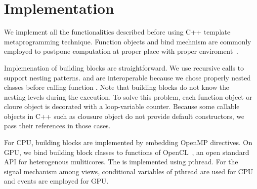 \section{Implementation}
\label{sec:details}

We implement all the functionalities described before using C++
template metaprogramming technique.
Function objects and bind mechnism are commonly employed to postpone computation
at proper place with proper enviroment~\cite{moderncpp}.

Implemenation of building blocks are straightforward. We use recursive calls
to support nesting patterns.  and  are interoperable
because we chose properly nested classes before calling function . Note that
building blocks do not know the nesting levels during the execution. To solve this
problem, each function object or cloure object is decorated with a loop-variable
counter.
Because some callable objects in C++ such as clousure object
do not provide default constructors, we pass their
references in those cases. 

For CPU, building blocks are implemented by embedding OpenMP directives. On GPU, we bind
building block classes to functions of OpenCL~\cite{opencl}, an open standard API
for heterogenous muliticores. The  is implemented using pthread.
For the signal mechanism among views, conditional variables of pthread are used
for CPU and events are employed for GPU.

